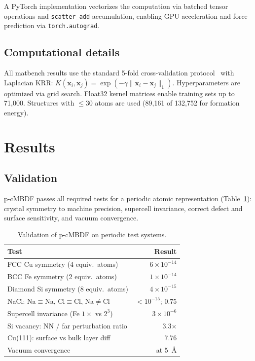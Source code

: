 \documentclass[twocolumn]{article}
\begin{document}
A PyTorch implementation vectorizes the computation via batched tensor operations and \texttt{scatter\_add} accumulation, enabling GPU acceleration and force prediction via \texttt{torch.autograd}.

\subsection{Computational details}

All matbench results use the standard 5-fold cross-validation protocol~\cite{dunn2020} with Laplacian KRR: $K(\mathbf{x}_i, \mathbf{x}_j) = \exp(-\gamma \|\mathbf{x}_i - \mathbf{x}_j\|_1)$.
Hyperparameters are optimized via grid search.
Float32 kernel matrices enable training sets up to 71,000.
Structures with $\leq$30 atoms are used (89,161 of 132,752 for formation energy).

\section{Results}

\subsection{Validation}

p-cMBDF passes all required tests for a periodic atomic representation (Table~\ref{tab:validation}): crystal symmetry to machine precision, supercell invariance, correct defect and surface sensitivity, and vacuum convergence.

\begin{table}[h]
\centering
\small
\caption{Validation of p-cMBDF on periodic test systems.}
\label{tab:validation}
\begin{tabular}{lr}
\toprule
Test & Result \\
\midrule
FCC Cu symmetry (4 equiv.\ atoms) & $6 \times 10^{-14}$ \\
BCC Fe symmetry (2 equiv.\ atoms) & $1 \times 10^{-14}$ \\
Diamond Si symmetry (8 equiv.\ atoms) & $4 \times 10^{-15}$ \\
NaCl: Na$\equiv$Na, Cl$\equiv$Cl, Na$\neq$Cl & $<10^{-15}$; 0.75 \\
Supercell invariance (Fe $1\times$ vs $2^3$) & $3 \times 10^{-6}$ \\
Si vacancy: NN / far perturbation ratio & 3.3$\times$ \\
Cu(111): surface vs bulk layer diff & 7.76 \\
Vacuum convergence & at 5~\AA \\
\bottomrule
\end{tabular}
\end{table}
\end{document}

